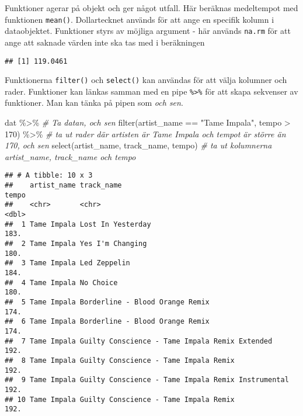 \documentclass[
]{book}
\newenvironment{Shaded}{\begin{snugshade}}{\end{snugshade}}
\newcommand{\AttributeTok}[1]{\textcolor[rgb]{0.77,0.63,0.00}{#1}}
\newcommand{\CommentTok}[1]{\textcolor[rgb]{0.56,0.35,0.01}{\textit{#1}}}
\newcommand{\DecValTok}[1]{\textcolor[rgb]{0.00,0.00,0.81}{#1}}
\newcommand{\FunctionTok}[1]{\textcolor[rgb]{0.00,0.00,0.00}{#1}}
\newcommand{\NormalTok}[1]{#1}
\newcommand{\SpecialCharTok}[1]{\textcolor[rgb]{0.00,0.00,0.00}{#1}}
\newcommand{\StringTok}[1]{\textcolor[rgb]{0.31,0.60,0.02}{#1}}
\theoremstyle{definition}
\theoremstyle{definition}
\theoremstyle{definition}
\theoremstyle{definition}
\theoremstyle{remark}
\begin{document}
Funktioner agerar på objekt och ger något utfall. Här beräknas medeltempot med funktionen \texttt{mean()}. Dollartecknet används för att ange en specifik kolumn i dataobjektet. Funktioner styrs av möjliga argument - här används \texttt{na.rm} för att ange att saknade värden inte ska tas med i beräkningen

\begin{Shaded}
\end{Shaded}

\begin{verbatim}
## [1] 119.0461
\end{verbatim}

Funktionerna \texttt{filter()} och \texttt{select()} kan användas för att välja kolumner och rader. Funktioner kan länkas samman med en pipe \texttt{\%\textgreater{}\%} för att skapa sekvenser av funktioner. Man kan tänka på pipen som \emph{och sen}.

\begin{Shaded}
\begin{Highlighting}[]
\NormalTok{dat }\SpecialCharTok{\%\textgreater{}\%}                                                    \CommentTok{\# Ta datan, och sen}
  \FunctionTok{filter}\NormalTok{(artist\_name }\SpecialCharTok{==} \StringTok{"Tame Impala"}\NormalTok{, tempo }\SpecialCharTok{\textgreater{}} \DecValTok{170}\NormalTok{) }\SpecialCharTok{\%\textgreater{}\%}    \CommentTok{\# ta ut rader där artisten är Tame Impala och tempot är större än 170, och sen}
  \FunctionTok{select}\NormalTok{(artist\_name, track\_name, tempo)                   }\CommentTok{\# ta ut kolumnerna artist\_name, track\_name och tempo}
\end{Highlighting}
\end{Shaded}

\begin{verbatim}
## # A tibble: 10 x 3
##    artist_name track_name                                         tempo
##    <chr>       <chr>                                              <dbl>
##  1 Tame Impala Lost In Yesterday                                   183.
##  2 Tame Impala Yes I'm Changing                                    180.
##  3 Tame Impala Led Zeppelin                                        184.
##  4 Tame Impala No Choice                                           180.
##  5 Tame Impala Borderline - Blood Orange Remix                     174.
##  6 Tame Impala Borderline - Blood Orange Remix                     174.
##  7 Tame Impala Guilty Conscience - Tame Impala Remix Extended      192.
##  8 Tame Impala Guilty Conscience - Tame Impala Remix               192.
##  9 Tame Impala Guilty Conscience - Tame Impala Remix Instrumental  192.
## 10 Tame Impala Guilty Conscience - Tame Impala Remix               192.
\end{verbatim}
\end{document}

